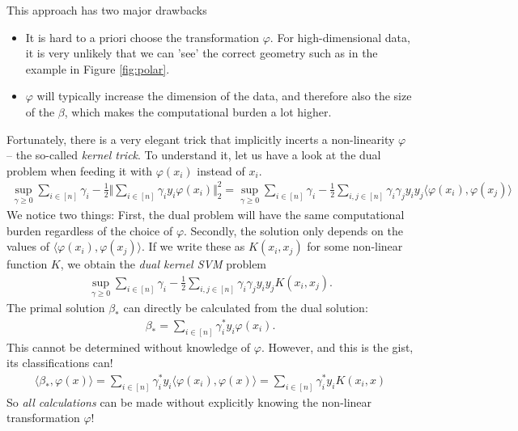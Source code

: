 \documentclass{article}
\newcommand{\sprod}[1]{\langle #1 \rangle}
\newcommand{\norm}[1]{\Vert #1 \Vert}
\begin{document}
This approach has two major drawbacks
\begin{itemize}
    \item It is hard to a priori choose the transformation $\varphi$. For high-dimensional data, it is very unlikely that we can 'see' the correct geometry such as in the example in Figure  \ref{fig:polar}.
    \item $\varphi$ will typically increase the dimension of the data, and therefore also the size of the $\beta$, which makes the computational burden a lot higher.
\end{itemize}
Fortunately, there is a very elegant trick that implicitly incerts a non-linearity $\varphi$ -- the so-called \emph{kernel trick}. To understand it, let us have a look at the dual problem when feeding it with $\varphi(x_i)$ instead of $x_i$.
\begin{align*}
        \sup_{\gamma \geq 0} \sum_{i \in [n]}\gamma_i -\tfrac{1}{2} \norm{\sum_{i\in [n]}\gamma_i y_i \varphi(x_i)}_2^2 = \sup_{\gamma \geq 0 }  \sum_{i \in [n]}\gamma_i -\tfrac{1}{2} \sum_{i,j\in [n]}\gamma_i\gamma_j y_iy_j \sprod{\varphi(x_i),\varphi(x_j)}
    \end{align*}
    We notice two things: First, the dual problem will have the same computational burden regardless of the choice of $\varphi$. Secondly, the solution only depends on the values of $\sprod{\varphi(x_i),\varphi(x_j)}$. If we write these as $K(x_i,x_j)$ for some non-linear function $K$, we obtain the \emph{dual kernel SVM} problem
    \begin{align}
        \sup_{\gamma \geq 0 }  \sum_{i \in [n]}\gamma_i -\tfrac{1}{2} \sum_{i,j\in [n]}\gamma_i\gamma_j y_iy_j K(x_i,x_j). \label{eq:kernelsvm}
    \end{align}
    The primal solution $\beta_*$ can directly be calculated from the dual solution:
    \begin{align*}
        \beta_* = \sum_{i \in [n]} \gamma_i^*y_i \varphi(x_i).
    \end{align*}
    This cannot be determined without knowledge of $\varphi$. However, and this is the gist, its classifications can!
    \begin{align}
        \sprod{\beta_*,\varphi(x)} =\sum_{i \in [n]} \gamma_i^*y_i \sprod{\varphi(x_i),\varphi(x)} =  \sum_{i \in [n]} \gamma_i^*y_i K(x_i,x) \label{eq:kernelclass}
    \end{align}
So \emph{all calculations} can be made without explicitly knowing the non-linear transformation $\varphi$!
\end{document}
